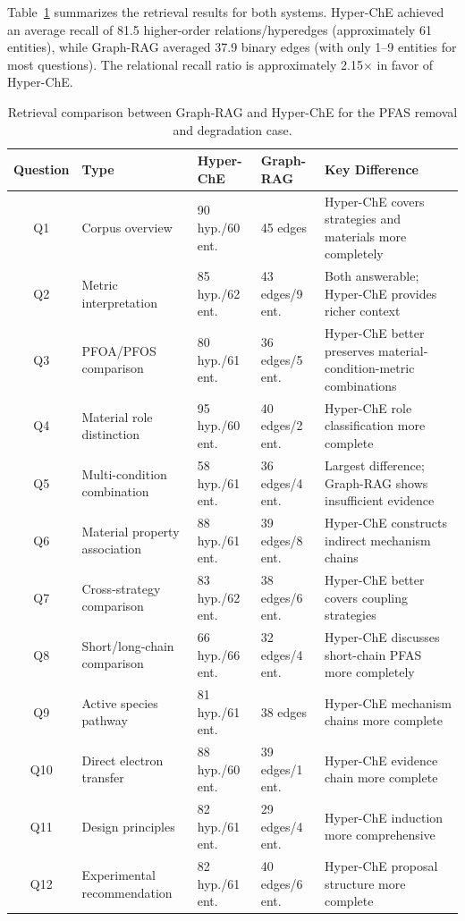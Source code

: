 Table~\ref{tab:pfas_retrieval_comparison} summarizes the retrieval results for both systems. Hyper-ChE achieved an average recall of 81.5 higher-order relations/hyperedges (approximately 61 entities), while Graph-RAG averaged 37.9 binary edges (with only 1--9 entities for most questions). The relational recall ratio is approximately 2.15$\times$ in favor of Hyper-ChE.

\begin{table}[htbp]
\centering
\caption{Retrieval comparison between Graph-RAG and Hyper-ChE for the PFAS removal and degradation case.}
\label{tab:pfas_retrieval_comparison}
\begin{tabular}{@{}cllll@{}}
\toprule
\textbf{Question} & \textbf{Type} & \textbf{Hyper-ChE} & \textbf{Graph-RAG} & \textbf{Key Difference} \\
\midrule
Q1 & Corpus overview & 90 hyp./60 ent. & 45 edges & Hyper-ChE covers strategies and materials more completely \\
Q2 & Metric interpretation & 85 hyp./62 ent. & 43 edges/9 ent. & Both answerable; Hyper-ChE provides richer context \\
Q3 & PFOA/PFOS comparison & 80 hyp./61 ent. & 36 edges/5 ent. & Hyper-ChE better preserves material-condition-metric combinations \\
Q4 & Material role distinction & 95 hyp./60 ent. & 40 edges/2 ent. & Hyper-ChE role classification more complete \\
Q5 & Multi-condition combination & 58 hyp./61 ent. & 36 edges/4 ent. & Largest difference; Graph-RAG shows insufficient evidence \\
Q6 & Material property association & 88 hyp./61 ent. & 39 edges/8 ent. & Hyper-ChE constructs indirect mechanism chains \\
Q7 & Cross-strategy comparison & 83 hyp./62 ent. & 38 edges/6 ent. & Hyper-ChE better covers coupling strategies \\
Q8 & Short/long-chain comparison & 66 hyp./66 ent. & 32 edges/4 ent. & Hyper-ChE discusses short-chain PFAS more completely \\
Q9 & Active species pathway & 81 hyp./61 ent. & 38 edges & Hyper-ChE mechanism chains more complete \\
Q10 & Direct electron transfer & 88 hyp./60 ent. & 39 edges/1 ent. & Hyper-ChE evidence chain more complete \\
Q11 & Design principles & 82 hyp./61 ent. & 29 edges/4 ent. & Hyper-ChE induction more comprehensive \\
Q12 & Experimental recommendation & 82 hyp./61 ent. & 40 edges/6 ent. & Hyper-ChE proposal structure more complete \\
\bottomrule
\end{tabular}
\end{table}

